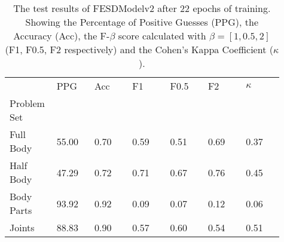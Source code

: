     \begin{table}[!htbp]
        \caption[Test Results of FESDModelv2]{The test results of FESDModelv2 after 22 epochs of training. Showing the Percentage of Positive Guesses (PPG), the Accuracy (Acc), the F-$\beta$ score calculated with $\beta = [1, 0.5, 2]$ (F1, F0.5, F2 respectively) and the Cohen's Kappa Coefficient ($\kappa$).}
        \label{tab:res_v2}
        \begin{tabular}{p{0.13\linewidth}p{0.13\linewidth}p{0.13\linewidth}p{0.13\linewidth}p{0.13\linewidth}p{0.13\linewidth}p{0.13\linewidth}}
\hline
{} &   PPG &  Acc &   F1 &  F0.5 &   F2 &  $\kappa$ \\
Problem Set   &       &      &      &       &      &           \\
\hline
Full Body  & 55.00 & 0.70 & 0.59 &  0.51 & 0.69 &      0.37 \\
Half Body  & 47.29 & 0.72 & 0.71 &  0.67 & 0.76 &      0.45 \\
Body Parts & 93.92 & 0.92 & 0.09 &  0.07 & 0.12 &      0.06 \\
Joints     & 88.83 & 0.90 & 0.57 &  0.60 & 0.54 &      0.51 \\
\hline
\end{tabular}

    \end{table}
  